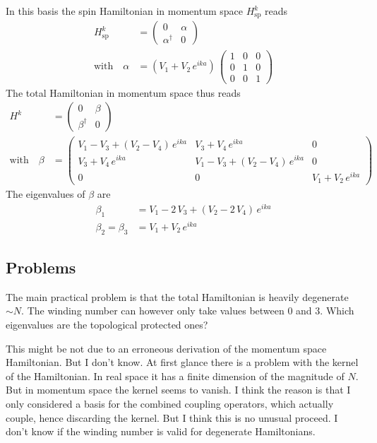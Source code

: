 In this basis the spin Hamiltonian in momentum space $H_\text{sp}^k$ reads
\begin{align*}
    H_\text{sp}^k &= \begin{pmatrix}
        0&\alpha\\
        \alpha^\dagger&0
    \end{pmatrix}\\
    \text{with}\quad\alpha&= \left(V_1+V_2\,e^{ika}\right)\,\begin{pmatrix}
        1&0&0\\
        0&1&0\\
        0&0&1
    \end{pmatrix}
\end{align*}
The total Hamiltonian in momentum space thus reads
\begin{align*}
    H^k &= \begin{pmatrix}
        0&\beta\\
        \beta^\dagger&0
    \end{pmatrix}\\
    \text{with}\quad\beta&=\begin{pmatrix}
        V_1-V_3+(V_2-V_4)\,e^{ika}&V_3+V_4\,e^{ika}&0\\
        V_3+V_4\,e^{ika}&V_1-V_3+(V_2-V_4)\,e^{ika}&0\\
        0&0&V_1+V_2\,e^{ika}
    \end{pmatrix}
\end{align*}
The eigenvalues of $\beta$ are
\begin{align*}
    \beta_1 &= V_1-2\,V_3+(V_2-2\,V_4)\,e^{ika}\\
    \beta_2 = \beta_3 &= V_1+V_2\,e^{ika}
\end{align*}
\subsection*{Problems}
The main practical problem is that the total Hamiltonian is heavily degenerate $\sim N$. The winding number can however only take values between $0$ and $3$. Which eigenvalues are the topological protected ones?

This might be not due to an erroneous derivation of the momentum space Hamiltonian. But I don't know. At first glance there is a problem with the kernel of the Hamiltonian. In real space it has a finite dimension of the magnitude of $N$. But in momentum space the kernel seems to vanish. I think the reason is that I only considered a basis for the combined coupling operators, which actually couple, hence discarding the kernel. But I think this is no unusual proceed. I don't know if the winding number is valid for degenerate Hamiltonians. 

